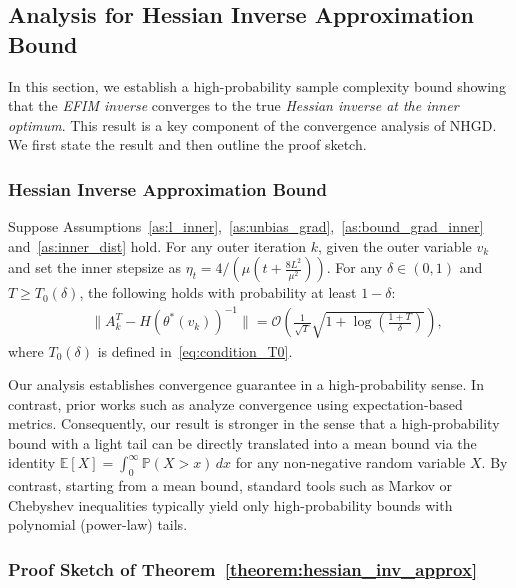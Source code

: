 \documentclass[11 pt]{article}
\begin{document}
\subsection{Analysis for Hessian Inverse Approximation Bound}
In this section, we establish a high-probability sample complexity bound showing that the \emph{EFIM inverse} converges to the true \emph{Hessian inverse at the inner optimum}. This result is a key component of the convergence analysis of NHGD. We first state the result and then outline the proof sketch.

\subsubsection{Hessian Inverse Approximation Bound}\label{sec:hess_inver_bnd}

\begin{theorem}\label{theorem:hessian_inv_approx}
Suppose Assumptions~\ref{as:l_inner},~\ref{as:unbias_grad},~\ref{as:bound_grad_inner} and~\ref{as:inner_dist} hold. For any outer iteration $k$, given the outer variable $v_k$ and set the inner stepsize as $\eta_t = 4/(\mu (t+\frac{8L^2}{\mu^2}))$.
For any $\delta \in (0,1)$ and $T\geq T_0(\delta)$, the following holds with probability 
at least $1-\delta$:
\begin{align*}
   \quad \big\|A_k^T - H(\theta^*(v_k))^{-1}\big\| =\mathcal{O}\!\left(\frac{1}{\sqrt{T}}\sqrt{1+\log\left(\frac{1+T}{\delta}\right)}\right),
\end{align*}
where $T_0(\delta)$ is defined in~\eqref{eq:condition_T0}.
\end{theorem}
Our analysis establishes convergence guarantee in a high-probability sense. In contrast, prior works such as \cite{ghadimi2018approximation,ji2021bilevel,arbel2021amortized,chen2021tighter,chen2022single,hong2023two} analyze convergence using expectation-based metrics. Consequently, our result is stronger in the sense that a high-probability bound with a light tail can be directly translated into a mean bound via the identity $\mathbb{E}[X] = \int_{0}^{\infty} \mathbb{P}(X > x)\,dx$ for any non-negative random variable $X$. By contrast, starting from a mean bound, standard tools such as Markov or Chebyshev inequalities typically yield only high-probability bounds with polynomial (power-law) tails.

\subsubsection{Proof Sketch of Theorem~\ref{theorem:hessian_inv_approx}}
\end{document}
